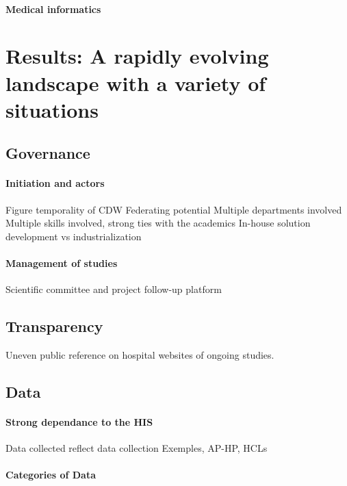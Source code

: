 \documentclass{report}
\begin{document}
\paragraph{Medical informatics}


\section{Results: A rapidly evolving landscape with a variety of
  situations}\label{sec:cdw:results}

\subsection{Governance}\label{subsec:cdw:results:governance}
\paragraph{Initiation and actors}
Figure temporality of CDW
Federating potential
Multiple departments involved
Multiple skills involved, strong ties with the academics
In-house solution development vs industrialization

\paragraph{Management of studies}

Scientific committee and project follow-up platform

\subsection{Transparency}\label{subsec:cdw:results:transparency}
Uneven public reference on hospital websites of ongoing studies.

\subsection{Data}\label{subsec:cdw:results:data}

\paragraph{Strong dependance to the HIS}

Data collected reflect data collection
Exemples, AP-HP, HCLs

\paragraph{Categories of Data}
\end{document}
